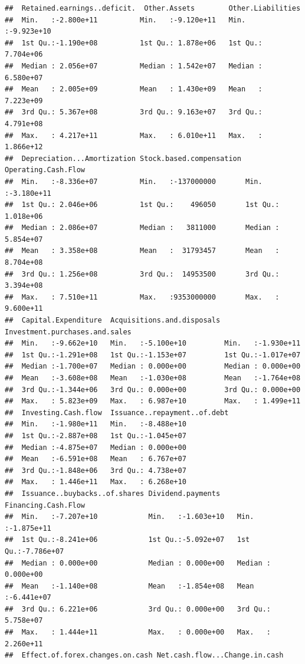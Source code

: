 \documentclass[11pt,]{article}
\begin{document}
\begin{verbatim}
##  Retained.earnings..deficit.  Other.Assets        Other.Liabilities   
##  Min.   :-2.800e+11          Min.   :-9.120e+11   Min.   :-9.923e+10  
##  1st Qu.:-1.190e+08          1st Qu.: 1.878e+06   1st Qu.: 7.704e+06  
##  Median : 2.056e+07          Median : 1.542e+07   Median : 6.580e+07  
##  Mean   : 2.005e+09          Mean   : 1.430e+09   Mean   : 7.223e+09  
##  3rd Qu.: 5.367e+08          3rd Qu.: 9.163e+07   3rd Qu.: 4.791e+08  
##  Max.   : 4.217e+11          Max.   : 6.010e+11   Max.   : 1.866e+12  
##  Depreciation...Amortization Stock.based.compensation Operating.Cash.Flow 
##  Min.   :-8.336e+07          Min.   :-137000000       Min.   :-3.180e+11  
##  1st Qu.: 2.046e+06          1st Qu.:    496050       1st Qu.: 1.018e+06  
##  Median : 2.086e+07          Median :   3811000       Median : 5.854e+07  
##  Mean   : 3.358e+08          Mean   :  31793457       Mean   : 8.704e+08  
##  3rd Qu.: 1.256e+08          3rd Qu.:  14953500       3rd Qu.: 3.394e+08  
##  Max.   : 7.510e+11          Max.   :9353000000       Max.   : 9.600e+11  
##  Capital.Expenditure  Acquisitions.and.disposals Investment.purchases.and.sales
##  Min.   :-9.662e+10   Min.   :-5.100e+10         Min.   :-1.930e+11            
##  1st Qu.:-1.291e+08   1st Qu.:-1.153e+07         1st Qu.:-1.017e+07            
##  Median :-1.700e+07   Median : 0.000e+00         Median : 0.000e+00            
##  Mean   :-3.608e+08   Mean   :-1.030e+08         Mean   :-1.764e+08            
##  3rd Qu.:-1.344e+06   3rd Qu.: 0.000e+00         3rd Qu.: 0.000e+00            
##  Max.   : 5.823e+09   Max.   : 6.987e+10         Max.   : 1.499e+11            
##  Investing.Cash.flow  Issuance..repayment..of.debt
##  Min.   :-1.980e+11   Min.   :-8.488e+10          
##  1st Qu.:-2.887e+08   1st Qu.:-1.045e+07          
##  Median :-4.875e+07   Median : 0.000e+00          
##  Mean   :-6.591e+08   Mean   : 6.767e+07          
##  3rd Qu.:-1.848e+06   3rd Qu.: 4.738e+07          
##  Max.   : 1.446e+11   Max.   : 6.268e+10          
##  Issuance..buybacks..of.shares Dividend.payments    Financing.Cash.Flow 
##  Min.   :-7.207e+10            Min.   :-1.603e+10   Min.   :-1.875e+11  
##  1st Qu.:-8.241e+06            1st Qu.:-5.092e+07   1st Qu.:-7.786e+07  
##  Median : 0.000e+00            Median : 0.000e+00   Median : 0.000e+00  
##  Mean   :-1.140e+08            Mean   :-1.854e+08   Mean   :-6.441e+07  
##  3rd Qu.: 6.221e+06            3rd Qu.: 0.000e+00   3rd Qu.: 5.758e+07  
##  Max.   : 1.444e+11            Max.   : 0.000e+00   Max.   : 2.260e+11  
##  Effect.of.forex.changes.on.cash Net.cash.flow...Change.in.cash

\end{verbatim}
\end{document}
